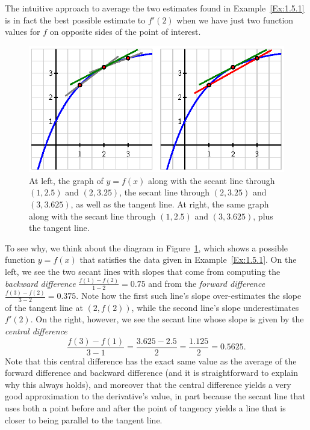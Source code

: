 The intuitive approach to average the two estimates found in Example~\ref{Ex:1.5.1} is in fact the best possible estimate to $f'(2)$ when we have just two function values for $f$ on opposite sides of the point of interest. 
\begin{figure}[h]
\begin{center}
\includegraphics{figures/1_5_Ex1.eps}
\caption{At left, the graph of $y = f(x)$ along with the secant line through $(1,2.5)$ and $(2,3.25)$, the secant line through $(2, 3.25)$ and $(3,3.625)$, as well as the tangent line.  At right, the same graph along with the secant line through $(1,2.5)$ and $(3,3.625)$, plus the tangent line.} \label{F:1.5.Ex1}
\end{center}
\end{figure}
To see why, we think about the diagram in Figure~\ref{F:1.5.Ex1}, which shows
a possible function $y = f(x)$ that satisfies the data given in Example~\ref{Ex:1.5.1}.  On the left, we see the two secant lines with slopes that come from computing the \emph{backward difference}  $\frac{f(1)-f(2)}{1-2} = 0.75$ and from the \emph{forward difference}  $\frac{f(3)-f(2)}{3-2} = 0.375.$  Note how the first such line's slope over-estimates the slope of the tangent line at $(2,f(2))$, while the second line's slope underestimates $f'(2)$.  On the right, however, we see the secant line whose slope is given by the \emph{central difference}  $$\frac{f(3)-f(1)}{3-1} = \frac{3.625-2.5}{2} = \frac{1.125}{2} = 0.5625.$$
Note that this central difference has the exact same value as the average of the forward difference and backward difference (and it is straightforward to explain why this always holds), and moreover that the central difference yields a very good approximation to the derivative's value, in part because the secant line that uses both a point before and after the point of tangency yields a line that is closer to being parallel to the tangent line.  

